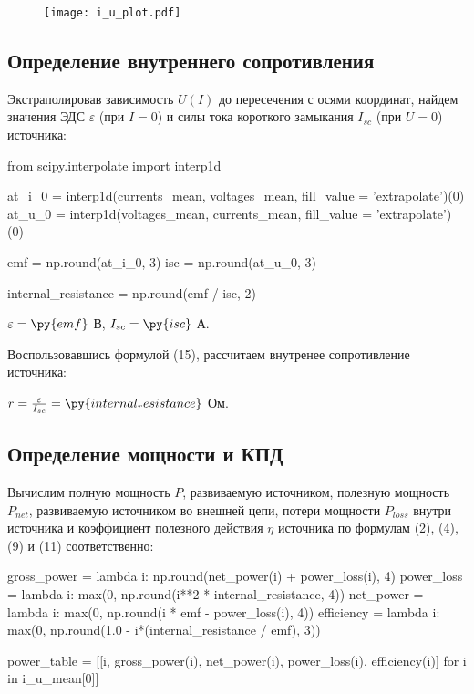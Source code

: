 \documentclass[12pt, a4paper]{article}
\begin{document}
\begin{figure}[H]
\texttt{[image: i\_u\_plot.pdf]}
\end{figure}

\subsection*{Определение внутреннего сопротивления}

Экстраполировав зависимость $U(I)$ до пересечения с осями координат,
найдем значения ЭДС $\varepsilon$ (при $I = 0$) и силы тока
короткого замыкания $I_{sc}$ (при $U = 0$) источника:

\begin{pycode}
from scipy.interpolate import interp1d

at_i_0 = interp1d(currents_mean, voltages_mean, fill_value = 'extrapolate')(0)
at_u_0 = interp1d(voltages_mean, currents_mean, fill_value = 'extrapolate')(0)

emf = np.round(at_i_0, 3)
isc = np.round(at_u_0, 3)

internal_resistance = np.round(emf / isc, 2)
\end{pycode}

\noindent
$\varepsilon = \py{emf}$ В, $I_{sc} = \py{isc}$ А.

Воспользовавшись формулой (15), рассчитаем внутренее сопротивление источника:

\noindent
$r = \frac{\varepsilon}{I_{sc}} = \py{internal_resistance}$ Ом.

\subsection*{Определение мощности и КПД}  

Вычислим полную мощность $P$, развиваемую источником, полезную мощность $P_{net}$,
развиваемую источником во внешней цепи, потери мощности $P_{loss}$ внутри
источника и коэффициент полезного действия $\eta$ источника
по формулам (2), (4), (9) и (11) соответственно:

\begin{pycode}
gross_power = lambda i: np.round(net_power(i) + power_loss(i), 4)
power_loss = lambda i: max(0, np.round(i**2 * internal_resistance, 4))
net_power = lambda i: max(0, np.round(i * emf - power_loss(i), 4))
efficiency = lambda i: max(0, np.round(1.0 - i*(internal_resistance / emf), 3))

power_table = [[i, gross_power(i), net_power(i), power_loss(i), efficiency(i)] for i in i_u_mean[0]]
\end{pycode}
\end{document}
